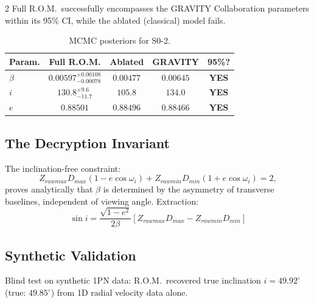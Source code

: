\documentclass[10pt, a4paper]{article}
\begin{document}
\begin{multicols}{2}
Full R.O.M.\ successfully encompasses the GRAVITY Collaboration parameters within its 95\% CI, while the ablated (classical) model fails.

\begin{table}[H]
\centering\footnotesize
\renewcommand{\arraystretch}{1.1}
\begin{tabular}{|l|c|c|c|c|}
\hline
\textbf{Param.} & \textbf{Full R.O.M.} & \textbf{Ablated} & \textbf{GRAVITY} & \textbf{95\%?} \\
\hline
$\beta$ & $0.00597^{+0.00108}_{-0.00078}$ & $0.00477$ & $0.00645$ & \textbf{YES} \\
\hline
$i$ & $130.8^{+9.6}_{-11.7}$ & $105.8$ & $134.0$ & \textbf{YES} \\
\hline
$e$ & $0.88501$ & $0.88496$ & $0.88466$ & \textbf{YES} \\
\hline
\end{tabular}
\caption{MCMC posteriors for S0-2.}
\label{tab:mcmc_results}
\end{table}

\subsection{The Decryption Invariant}
\hypertarget{sec:analytical_sini}{}\label{sec:analytical_sini}

The inclination-free constraint:
\begin{equation}
Z_{rawmax} D_{max}(1 - e\cos\omega_i) + Z_{rawmin} D_{min}(1 + e\cos\omega_i) = 2,
\end{equation}
proves analytically that $\beta$ is determined by the asymmetry of transverse baselines, independent of viewing angle. Extraction:
\begin{equation}
\boxed{\sin i = \frac{\sqrt{1-e^2}}{2\beta}\left[ Z_{rawmax}D_{max} - Z_{rawmin}D_{min} \right]}
\end{equation}

\subsection{Synthetic Validation}
\hypertarget{sec:synthetic_validation}{}\label{sec:synthetic_validation}

Blind test on synthetic 1PN data: R.O.M.\ recovered true inclination $i = 49.92^\circ$ (true: $49.85^\circ$) from 1D radial velocity data alone.




\end{multicols}
\end{document}

